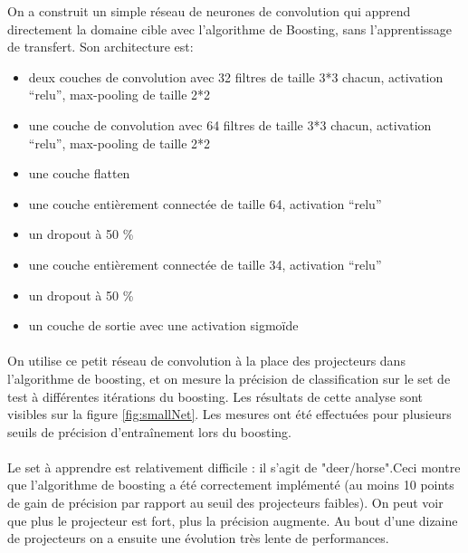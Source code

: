 \documentclass[11 pt]{article}
\begin{document}
\begin{samepage}
On a construit un simple réseau de neurones de convolution  qui apprend directement la domaine cible avec l'algorithme de Boosting, sans l'apprentissage de transfert. Son architecture est:\\ \medskip \nopagebreak
  \begin{itemize}
    \item deux couches de convolution avec 32 filtres de taille 3*3 chacun, activation “relu”, max-pooling de taille 2*2
    \nopagebreak
    \item une couche de convolution avec 64 filtres de taille 3*3 chacun, activation “relu”, max-pooling de taille 2*2
    \nopagebreak
    \item une couche flatten
    \nopagebreak
    \item une couche entièrement connectée de taille 64, activation “relu”
    \nopagebreak
    \item un dropout à 50 \%
    \nopagebreak
    \item une couche entièrement connectée de taille 34, activation “relu”
    \nopagebreak
    \item un dropout à 50 \%
    \nopagebreak
    \item un couche de sortie avec une activation sigmoïde
  \end{itemize}
\end{samepage}
\paragraph{} On utilise ce petit réseau de convolution \`a la place des projecteurs dans l'algorithme de boosting, et on mesure la précision de classification sur le set de test \`a différentes itérations du boosting. Les résultats de cette analyse sont visibles sur la figure \ref{fig:smallNet}. Les mesures ont été effectuées pour plusieurs seuils de précision d’entraînement lors du boosting.
\paragraph{}Le set à apprendre est relativement difficile : il s'agit de "deer/horse".Ceci montre que l'algorithme de boosting a été correctement implémenté (au moins 10 points de gain de précision par rapport au seuil des projecteurs faibles). On peut voir que plus le projecteur est fort, plus la précision augmente. Au bout d'une dizaine de projecteurs on a ensuite une évolution très lente de performances.
\end{document}
